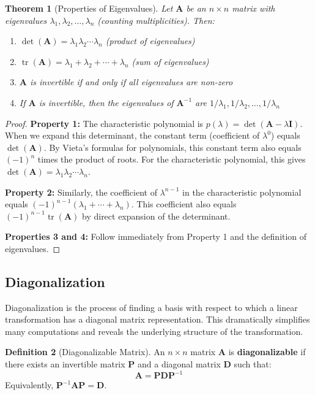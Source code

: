 \documentclass[12pt]{article}
\numberwithin{equation}{section}
\newcommand{\mat}[1]{\mathbf{#1}}        %
\newcommand{\tr}{\operatorname{tr}}
\theoremstyle{plain}
\newtheorem{theorem}{Theorem}[section]
\theoremstyle{definition}
\newtheorem{definition}[theorem]{Definition}
\theoremstyle{remark}
\begin{document}
\begin{theorem}[Properties of Eigenvalues]
Let $\mat{A}$ be an $n \times n$ matrix with eigenvalues $\lambda_1, \lambda_2, \ldots, \lambda_n$ (counting multiplicities). Then:
\begin{enumerate}
\item $\det(\mat{A}) = \lambda_1 \lambda_2 \cdots \lambda_n$ (product of eigenvalues)
\item $\tr(\mat{A}) = \lambda_1 + \lambda_2 + \cdots + \lambda_n$ (sum of eigenvalues)
\item $\mat{A}$ is invertible if and only if all eigenvalues are non-zero
\item If $\mat{A}$ is invertible, then the eigenvalues of $\mat{A}^{-1}$ are $1/\lambda_1, 1/\lambda_2, \ldots, 1/\lambda_n$
\end{enumerate}
\end{theorem}

\begin{proof}
\textbf{Property 1:} The characteristic polynomial is $p(\lambda) = \det(\mat{A} - \lambda\mat{I})$. When we expand this determinant, the constant term (coefficient of $\lambda^0$) equals $\det(\mat{A})$. By Vieta's formulas for polynomials, this constant term also equals $(-1)^n$ times the product of roots. For the characteristic polynomial, this gives $\det(\mat{A}) = \lambda_1 \lambda_2 \cdots \lambda_n$.

\textbf{Property 2:} Similarly, the coefficient of $\lambda^{n-1}$ in the characteristic polynomial equals $(-1)^{n-1}(\lambda_1 + \cdots + \lambda_n)$. This coefficient also equals $(-1)^{n-1}\tr(\mat{A})$ by direct expansion of the determinant.

\textbf{Properties 3 and 4:} Follow immediately from Property 1 and the definition of eigenvalues.
\end{proof}

\subsection{Diagonalization}

Diagonalization is the process of finding a basis with respect to which a linear transformation has a diagonal matrix representation. This dramatically simplifies many computations and reveals the underlying structure of the transformation.

\begin{definition}[Diagonalizable Matrix]
An $n \times n$ matrix $\mat{A}$ is \textbf{diagonalizable} if there exists an invertible matrix $\mat{P}$ and a diagonal matrix $\mat{D}$ such that:
$$\mat{A} = \mat{P}\mat{D}\mat{P}^{-1}$$
Equivalently, $\mat{P}^{-1}\mat{A}\mat{P} = \mat{D}$.
\end{definition}
\end{document}
